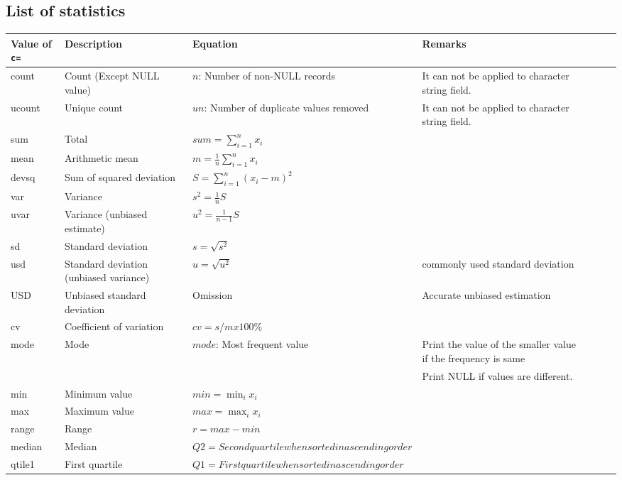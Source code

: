 \subsection*{List of statistics}
\begin{table}[t]
{\small
\renewcommand{\arraystretch}{1.5}
\begin{tabular}{lp{4cm}lp{4cm}lp{3cm}l}
\hline
Value of \verb|c=| & Description & Equation & Remarks \\
\hline
count  & Count (Except NULL value) & $n$: Number of non-NULL records & It can not be applied to character string field.\\
ucount & Unique count     & $un$: Number of duplicate values removed &  It can not be applied to character string field. \\
sum    & Total             & $sum=\sum_{i=1}^n x_i$ & \\
mean   & Arithmetic mean         & $m=\frac{1}{n}\sum_{i=1}^n x_i$ & \\
devsq  & Sum of squared deviation       & $S=\sum_{i=1}^n(x_i-m)^2$ & \\
var    & Variance             & $s^2=\frac{1}{n}S$ & \\
uvar   & Variance (unbiased estimate) & $u^2=\frac{1}{n-1}S$ & \\
sd     & Standard deviation         & $s=\sqrt{s^2}$ & \\
usd    & Standard deviation (unbiased variance) & $u=\sqrt{u^2}$ & commonly used standard deviation\\
USD    & Unbiased standard deviation     & Omission              & Accurate unbiased estimation \\
cv     & Coefficient of variation  & $cv=s/mx100\%$ & \\
mode   & Mode           & $mode$: Most frequent value & Print the value of the smaller value if the frequency is same \\
       &                  &                   & Print NULL if values are different.\\
min    & Minimum value           & $min=\min_i x_i$ & \\
max    & Maximum value           & $max=\max_i x_i$ & \\
range  & Range             & $r=max-min$  & \\
median & Median           & $Q2=Second quartile when sorted in ascending order$ & \\
qtile1 & First quartile      & $Q1=First quartile when sorted in ascending order$ & \\

\end{tabular}}
\end{table}
